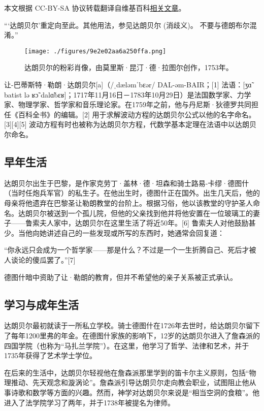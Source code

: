 
本文根据 CC-BY-SA 协议转载翻译自维基百科\href{https://en.wikipedia.org/wiki/Jean_le_Rond_d\%27Alembert}{相关文章}。

“‘达朗贝尔’重定向至此。其他用法，参见达朗贝尔 (消歧义)。  
不要与德朗布尔混淆。”
\begin{figure}[ht]
\centering
\texttt{[image: ./figures/9e2e02aa6a250ffa.png]}
\caption{达朗贝尔的粉彩肖像，由莫里斯·昆汀·德·拉图尔创作，1753年。} \label{fig_BR_1}
\end{figure}
让-巴蒂斯特·勒朗·达朗贝尔[a]（/ˌdæləmˈbɛər/ DAL-əm-BAIR；[1] 法语：[ʒɑ̃ batist lə ʁɔ̃ dalɑ̃bɛʁ]；1717年11月16日－1783年10月29日）是法国数学家、力学家、物理学家、哲学家和音乐理论家。在1759年之前，他与丹尼斯·狄德罗共同担任《百科全书》的编辑。[2] 用于求解波动方程的达朗贝尔公式以他的名字命名。[3][4][5] 波动方程有时也被称为达朗贝尔方程，代数学基本定理在法语中以达朗贝尔命名。
\subsection{早年生活}
达朗贝尔出生于巴黎，是作家克劳丁·盖林·德·坦森和骑士路易-卡缪·德图什（当时任炮兵军官）的私生子。在他出生时，德图什正在国外。出生几天后，他的母亲将他遗弃在巴黎圣让勒朗教堂的台阶上。根据习俗，他以该教堂的守护圣人命名。达朗贝尔被送到一个孤儿院，但他的父亲找到他并将他安置在一位玻璃工的妻子——鲁索夫人家中，达朗贝尔在这里生活了将近50年。[6] 鲁索夫人对他鼓励甚少。当他向她讲述自己的一些发现或所写的东西时，她通常会回复道：

“你永远只会成为一个哲学家——那是什么？不过是一个一生折腾自己、死后才被人谈论的傻瓜罢了。”[7]

德图什暗中资助了让·勒朗的教育，但并不希望他的亲子关系被正式承认。
\subsection{学习与成年生活}

达朗贝尔最初就读于一所私立学校。骑士德图什在1726年去世时，给达朗贝尔留下了每年1200里弗的年金。在德图什家族的影响下，12岁的达朗贝尔进入了詹森派的四国学院（也称为“马扎兰学院”）。在这里，他学习了哲学、法律和艺术，并于1735年获得了艺术学士学位。

在后来的生活中，达朗贝尔轻视他在詹森派那里学到的笛卡尔主义原则，包括“物理推动、先天观念和漩涡论”。詹森派引导达朗贝尔走向教会职业，试图阻止他从事诗歌和数学等方面的兴趣。然而，神学对达朗贝尔来说是“相当空洞的食粮”。他进入了法学院学习了两年，并于1738年被提名为律师。

